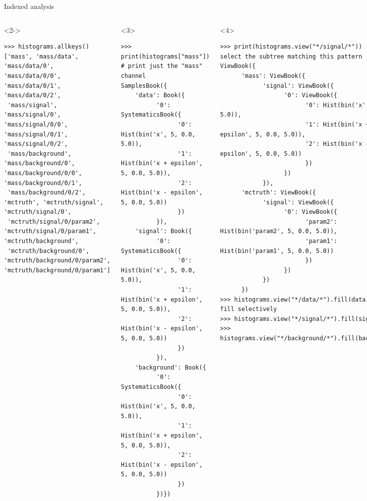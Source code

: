 \documentclass[aspectratio=169]{beamer}
\begin{document}
\begin{frame}[fragile]{Indexed analysis}
\begin{columns}
\begin{onlyenv}
\scriptsize
\begin{uncoverenv}<2->
\begin{verbatim}
>>> histograms.allkeys()
['mass', 'mass/data', 'mass/data/0', 'mass/data/0/0', 'mass/data/0/1', 'mass/data/0/2',
 'mass/signal', 'mass/signal/0', 'mass/signal/0/0', 'mass/signal/0/1', 'mass/signal/0/2',
 'mass/background', 'mass/background/0', 'mass/background/0/0',  'mass/background/0/1',
 'mass/background/0/2', 'mctruth', 'mctruth/signal', 'mctruth/signal/0',
 'mctruth/signal/0/param2', 'mctruth/signal/0/param1', 'mctruth/background',
 'mctruth/background/0', 'mctruth/background/0/param2', 'mctruth/background/0/param1']
\end{verbatim}
\end{uncoverenv}
\vspace{-0.7 cm}
\end{onlyenv}
\begin{onlyenv}<3>
\scriptsize
\begin{verbatim}
>>> print(histograms["mass"])                   # print just the "mass" channel
SamplesBook({
    'data': Book({
          '0': SystematicsBook({
                '0': Hist(bin('x', 5, 0.0, 5.0)),
                '1': Hist(bin('x + epsilon', 5, 0.0, 5.0)),
                '2': Hist(bin('x - epsilon', 5, 0.0, 5.0))
                })
          }),
    'signal': Book({
          '0': SystematicsBook({
                '0': Hist(bin('x', 5, 0.0, 5.0)),
                '1': Hist(bin('x + epsilon', 5, 0.0, 5.0)),
                '2': Hist(bin('x - epsilon', 5, 0.0, 5.0))
                })
          }),
    'background': Book({
          '0': SystematicsBook({
                '0': Hist(bin('x', 5, 0.0, 5.0)),
                '1': Hist(bin('x + epsilon', 5, 0.0, 5.0)),
                '2': Hist(bin('x - epsilon', 5, 0.0, 5.0))
                })
          })})
\end{verbatim}
\end{onlyenv}
\begin{onlyenv}<4>
\scriptsize
\begin{verbatim}
>>> print(histograms.view("*/signal/*"))        # select the subtree matching this pattern
ViewBook({
      'mass': ViewBook({
            'signal': ViewBook({
                  '0': ViewBook({
                        '0': Hist(bin('x', 5, 0.0, 5.0)),
                        '1': Hist(bin('x + epsilon', 5, 0.0, 5.0)),
                        '2': Hist(bin('x - epsilon', 5, 0.0, 5.0))
                        })
                  })
            }),
      'mctruth': ViewBook({
            'signal': ViewBook({
                  '0': ViewBook({
                        'param2': Hist(bin('param2', 5, 0.0, 5.0)),
                        'param1': Hist(bin('param1', 5, 0.0, 5.0))
                        })
                  })
            })
      })
>>> histograms.view("*/data/*").fill(data)      # fill selectively
>>> histograms.view("*/signal/*").fill(signal)
>>> histograms.view("*/background/*").fill(background)
\end{verbatim}
\end{onlyenv}
\end{columns}
\end{frame}
\end{document}
